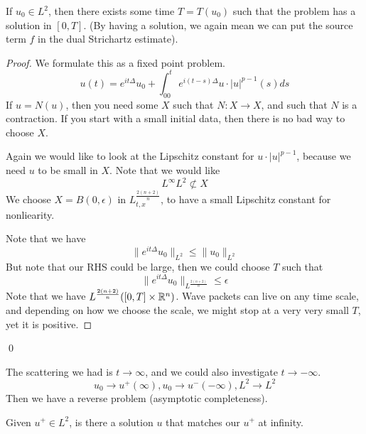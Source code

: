 \begin{theorem}
    If $u_0\in L^2$, then there exists some time $T=T(u_0)$ such that the problem has a solution in $[0,T]$. (By having a solution, we again mean we can put the source term $f$ in the dual Strichartz estimate).
\end{theorem}
\begin{proof}
    We formulate this as a fixed point problem. 
    \begin{equation*}
        u(t)=e^{it\Delta}u_0+\int_00^t e^{i(t-s)\Delta}u\cdot|u|^{p-1}(s)ds
    \end{equation*}
    If $u=N(u)$, then you need some $X$ such that $N: X\to X$, and such that $N$ is a contraction. If you start with a small initial data, then there is no bad way to choose $X$. 

    Again we would like to look at the Lipschitz constant for $u\cdot|u|^{p-1}$, because we need $u$ to be small in $X$. Note that we would like
    \begin{equation*}
        L^\infty L^2\not\subset X
    \end{equation*}
    We choose $X=B(0,\epsilon)$ in $L_{t,x}^\frac{2(n+2)}{n}$, to have a small Lipschitz constant for nonliearity.

    Note that we have
    \begin{equation*}
        \|e^{it\Delta}u_0\|_{L^2}\leq\|u_0\|_{L^2}
    \end{equation*}
    But note that our RHS could be large, then we could choose $T$ such that
    \begin{equation*}
        \|e^{it\Delta}u_0\|_{L^\frac{2(n+2)}{n}}\leq\epsilon
    \end{equation*}
    Note that we have $L^\frac{2(n+2)}{n}([0,T]\times\mathbb{R}^n)$.
    Wave packets can live on any time scale, and depending on how we choose the scale, we might stop at a very very small $T$, yet it is positive.
\end{proof}
\qed

The scattering we had is $t\to\infty$, and we could also investigate $t\to -\infty$. 
\begin{equation*}
    u_0\to u^+(\infty), u_0\to u^-(-\infty), L^2\to L^2
\end{equation*}
Then we have a reverse problem (asymptotic completeness).
\begin{problem}
    Given $u^+\in L^2$, is there a solution $u$ that matches our $u^+$ at infinity.
\end{problem}

